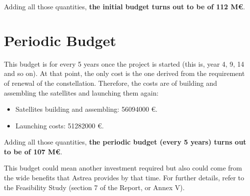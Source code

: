 Adding all those quantities, \textbf{the initial budget turns out to be of 112 M\euro}. 

\newpage
\section{Periodic Budget}
This budget is for every 5 years once the project is started (this is, year 4, 9, 14 and so on). At that point, the only cost is the one derived from the requirement of renewal of the constellation. Therefore, the costs are of building and assembling the satellites and launching them again:

\begin{itemize}
\item Satellites building and assembling: 56094000 \euro .
\item Launching costs: 51282000 \euro .
\end{itemize}

Adding all those quantities, \textbf{the periodic budget (every 5 years) turns out to be of 107 M\euro}. 

This budget could mean another investment required but also could come from the wide benefits that Astrea provides by that time. For further details, refer to the Feasibility Study (section 7 of the Report, or Annex V).



